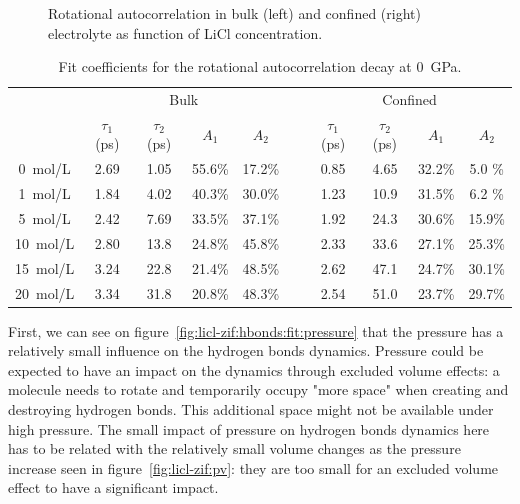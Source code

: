 \documentclass[thesis]{subfiles}
\begin{document}
\begin{figure}[ht]
    \centering
    
    \caption{Rotational autocorrelation in bulk (left) and confined (right)
    electrolyte as function of LiCl concentration.}
    \label{fig:licl-zif:rotcf}
\end{figure}

\begin{table}[ht]
    \caption{Fit coefficients for the rotational autocorrelation decay at \SI{0}{GPa}.}
    \label{table:licl-zif:rotcf}
    \centering
    \begin{tabular}{c c c c c c c c c c}
        \toprule
        \multicolumn{1}{c}{~} & \multicolumn{4}{c}{Bulk}                          &~& \multicolumn{4}{c}{Confined} \\
        \multicolumn{1}{c}{~} & $\tau_1$ (ps) & $\tau_2$ (ps) & $A_1$   & $A_2$   &~& $\tau_1$ (ps) & $\tau_2$ (ps) & $A_1$   & $A_2$   \\
        \midrule
        \SI{0}{mol/L}         &    2.69       &    1.05       & 55.6\% & 17.2\% &~&    0.85       &     4.65      &  32.2\% &  5.0  \% \\
        \SI{1}{mol/L}         &    1.84       &    4.02       & 40.3\% & 30.0\% &~&    1.23       &     10.9      &  31.5\% &  6.2  \% \\
        \SI{5}{mol/L}         &    2.42       &    7.69       & 33.5\% & 37.1\% &~&    1.92       &     24.3      &  30.6\% &  15.9\% \\
        \SI{10}{mol/L}        &    2.80       &    13.8       & 24.8\% & 45.8\% &~&    2.33       &     33.6      &  27.1\% &  25.3\% \\
        \SI{15}{mol/L}        &    3.24       &    22.8       & 21.4\% & 48.5\% &~&    2.62       &     47.1      &  24.7\% &  30.1\% \\
        \SI{20}{mol/L}        &    3.34       &    31.8       & 20.8\% & 48.3\% &~&    2.54       &     51.0      &  23.7\% &  29.7\% \\
        \bottomrule
    \end{tabular}
\end{table}

First, we can see on figure~\ref{fig:licl-zif:hbonds:fit:pressure} that the
pressure has a relatively small influence on the hydrogen bonds dynamics.
Pressure could be expected to have an impact on the dynamics through excluded
volume effects\cite{Fogarty2014}: a molecule needs to rotate and temporarily
occupy "more space" when creating and destroying hydrogen bonds. This
additional space might not be available under high pressure. The small impact of
pressure on hydrogen bonds dynamics here has to be related with the relatively
small volume changes as the pressure increase seen in
figure~\ref{fig:licl-zif:pv}: they are too small for an excluded volume effect
to have a significant impact.
\end{document}
